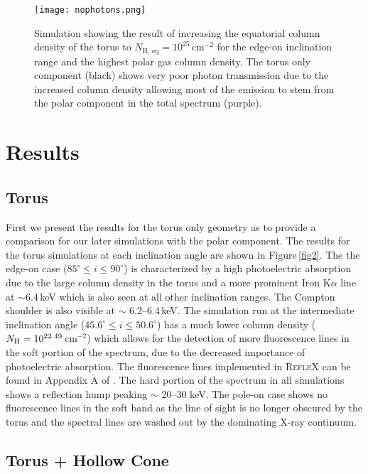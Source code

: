 \documentclass[fleqn,usenatbib]{mnras}
\begin{document}
    \begin{figure}
        \centering
        \texttt{[image: nophotons.png]}
        \caption{Simulation showing the result of increasing the equatorial column density of the torus to $N_{\text{H, eq}} = 10^{25}$\,cm$^{-2}$ for the edge-on inclination range and the highest polar gas column density. The torus only component (black) shows very poor photon transmission due to the increased column density allowing most of the emission to stem from the polar component in the total spectrum (purple).}
        \label{fig4.5}
    \end{figure}
    
\section{Results}

    \subsection{Torus}
    
        First we present the results for the torus only geometry as to provide a comparison for our later simulations with the polar component. The results for the torus simulations at each inclination angle are shown in Figure\,\ref{fig2}. The the edge-on case ($85^{\circ} \leq i \leq 90^{\circ}$) is characterized by a high photoelectric absorption due to the large column density in the torus and a more prominent Iron K$\alpha$ line at $\sim$6.4\,keV which is also seen at all other inclination ranges. The Compton shoulder is also visible at $\sim$ 6.2--6.4\,keV. The simulation run at the intermediate inclination angle ($45.6^{\circ} \leq i \leq 50.6^{\circ}$) has a much lower column density ($N_{\rm{H}} = 10^{22.49}$\,cm$^{-2}$) which allows for the detection of more fluorescence lines in the soft portion of the spectrum, due to the decreased importance of photoelectric absorption. The fluorescence lines implemented in \textsc{RefleX} can be found in Appendix A of \cite{RefleX}. The hard portion of the spectrum in all simulations shows a reflection hump peaking $\sim$ 20--30 keV. The pole-on case shows no fluorescence lines in the soft band as the line of sight is no longer obscured by the torus and the spectral lines are washed out by the dominating X-ray continuum.
    
    \subsection{Torus + Hollow Cone}
    
\end{document}
